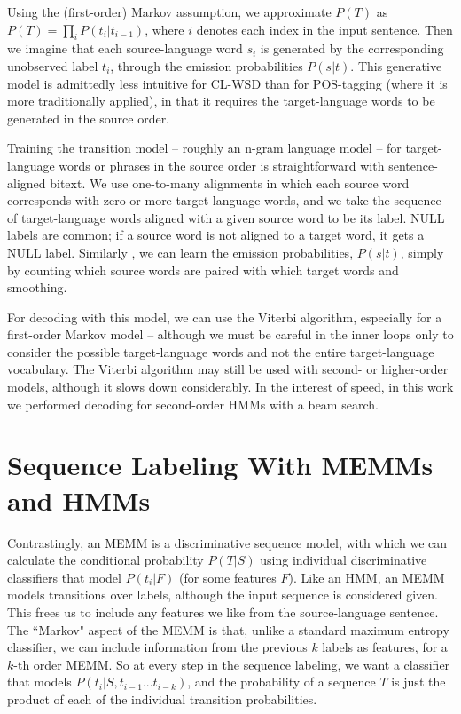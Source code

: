 Using the (first-order) Markov assumption, we approximate $P(T)$ as $P(T) =
\prod_{i} P(t_i | t_{i-1})$, where $i$ denotes each index in the input
sentence. Then we imagine that each source-language word $s_i$ is generated by
the corresponding unobserved label $t_i$, through the emission probabilities
$P(s|t)$. This generative model is admittedly less intuitive for CL-WSD than
for POS-tagging (where it is more traditionally applied), in that it requires
the target-language words to be generated in the source order.

Training the transition model -- roughly an n-gram language model -- for
target-language words or phrases in the source order is straightforward with
sentence-aligned bitext. We use one-to-many alignments in which each source
word corresponds with zero or more target-language words, and we take the
sequence of target-language words aligned with a given source word to be its
label. NULL labels are common; if a source word is not aligned to a target
word, it gets a NULL label. Similarly , we can learn the emission
probabilities, $P(s|t)$, simply by counting which source words are paired with
which target words and smoothing.

For decoding with this model, we can use the Viterbi algorithm, especially for
a first-order Markov model -- although we must be careful in the inner loops
only to consider the possible target-language words and not the entire
target-language vocabulary. The Viterbi algorithm may still be used with
second- or higher-order models, although it slows down considerably. In the
interest of speed, in this work we performed decoding for second-order HMMs
with a beam search.

\section{Sequence Labeling With MEMMs and HMMs}
Contrastingly, an MEMM is a discriminative sequence model, with
which we can calculate the conditional probability $P(T|S)$ using individual
discriminative classifiers that model $P(t_i | F)$ (for some features $F$).
Like an HMM, an MEMM models transitions over labels, although the
input sequence is considered given. This frees us to include any features we
like from the source-language sentence. The ``Markov" aspect of the MEMM is
that, unlike a standard maximum entropy classifier, we can include information
from the previous $k$ labels as features, for a $k$-th order MEMM. So at every
step in the sequence labeling, we want a classifier that models 
$P(t_i | S, t_{i-1}...t_{i-k})$, and the probability of a sequence $T$ is just
the product of each of the individual transition probabilities.

